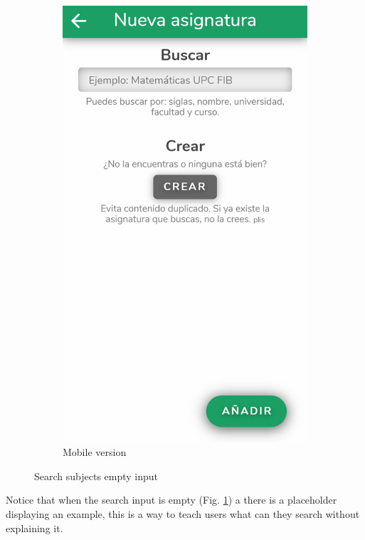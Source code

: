 \begin{figure}[ht!]
\begin{subfigure}[b]{0.243\textwidth-0.1cm}
        \includegraphics[frame,width=\textwidth]{media/screenshots/screenshot-search-empty.png}
        \caption{Mobile version}
    \end{subfigure}
    \caption{Search subjects empty input}
    \label{fig:search-empty}
\end{figure}
\vfill

\clearpage\newpage
Notice that when the search input is empty (Fig. \ref{fig:search-empty}) a there is a placeholder displaying an example, this is a way to teach users what can they search without explaining it. %

